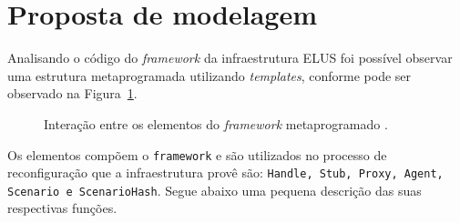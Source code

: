 \documentclass[12pt]{article}
\newcommand{\fig}[4][h]{
  \begin{figure}[#1] {\centering{\texttt{[image: fig/\#2]}}\par}
    \caption{#3\label{fig:#2}}
  \end{figure}
}
\begin{document}
\section{Proposta de modelagem}
\label{sec:modelagem}
Analisando o código do \textit{framework} da infraestrutura ELUS foi possível observar uma estrutura metaprogramada utilizando \textit{templates}, conforme pode ser observado na Figura~\ref{fig:framework.pdf}. 


\fig{framework.pdf}{Interação entre os elementos do \textit{framework} metaprogramado \cite{gracioli2009elus}.}{scale=.4}

Os elementos compõem o \texttt{framework} e são utilizados no processo de reconfiguração que a infraestrutura provê são: \texttt{Handle, Stub, Proxy, Agent, Scenario e ScenarioHash}. Segue abaixo uma pequena descrição das suas respectivas funções.
\end{document}
